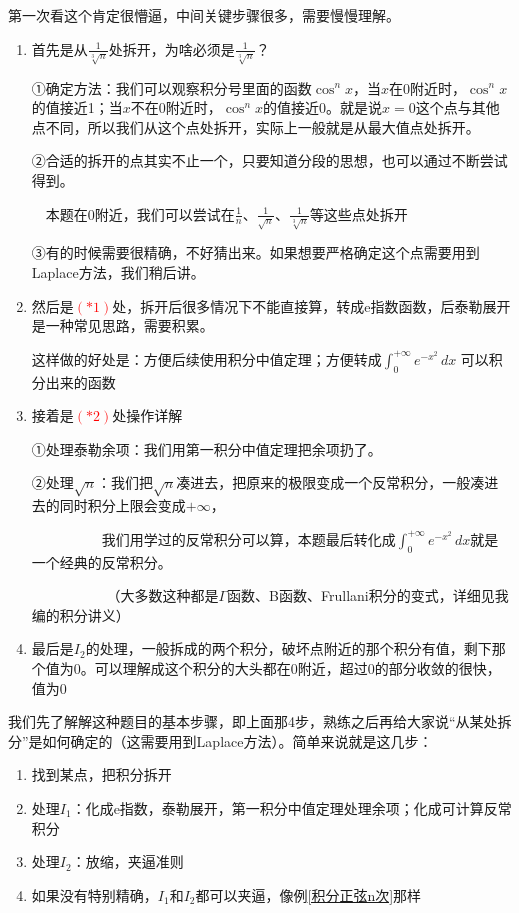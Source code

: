 \vspace{1mm}
\begin{remark}
第一次看这个肯定很懵逼，中间关键步骤很多，需要慢慢理解。
\begin{enumerate}
\item 首先是从$\frac{1}{\sqrt[3]{n}}$处拆开，为啥必须是$\frac{1}{\sqrt[3]{n}}$？

①确定方法：我们可以观察积分号里面的函数$\cos^n x$，当$x$在0附近时，$\cos^n x$的值接近1；当$x$不在0附近时，$\cos^n x$的值接近0。就是说$x=0$这个点与其他点不同，所以我们从这个点处拆开，实际上一般就是从最大值点处拆开。

②合适的拆开的点其实不止一个，只要知道分段的思想，也可以通过不断尝试得到。

$\quad$本题在0附近，我们可以尝试在$\frac{1}{n} $、$\frac{1}{\sqrt{n}} $、$\frac{1}{\sqrt[3]{n}} $等这些点处拆开

③有的时候需要很精确，不好猜出来。如果想要严格确定这个点需要用到Laplace方法，我们稍后讲。
\item 然后是\textcolor{red}{$(*1)$}处，拆开后很多情况下不能直接算，转成e指数函数，后泰勒展开是一种常见思路，需要积累。

这样做的好处是：方便后续使用积分中值定理；方便转成$\int_{0}^{+\infty}e^{-x^2}\,dx$
可以积分出来的函数 

\item 接着是\textcolor{red}{$(*2)$}处操作详解

①处理泰勒余项：我们用第一积分中值定理把余项扔了。

②处理$\sqrt{n}$：我们把$\sqrt{n}$凑进去，把原来的极限变成一个反常积分，一般凑进去的同时积分上限会变成$+\infty$，

$\quad \quad \quad\quad\quad$我们用学过的反常积分可以算，本题最后转化成$\int_{0}^{+\infty}e^{-x^2}\,dx$就是一个经典的反常积分。

$\quad \quad \quad\quad\quad$
（大多数这种都是$\Gamma$函数、B函数、Frullani积分的变式，详细见我编的积分讲义）
\item 最后是$I_2$的处理，一般拆成的两个积分，破坏点附近的那个积分有值，剩下那个值为0。可以理解成这个积分的大头都在0附近，超过0的部分收敛的很快，值为0
\end{enumerate}
\end{remark}

\vspace{3mm}
我们先了解解这种题目的基本步骤，即上面那4步，熟练之后再给大家说“从某处拆分”是如何确定的（这需要用到Laplace方法）。简单来说就是这几步：
\begin{enumerate}\label{steps}
\item 找到某点，把积分拆开
\item 处理$I_1$：化成e指数，泰勒展开，第一积分中值定理处理余项；化成可计算反常积分
\item 处理$I_2$：放缩，夹逼准则
\item 如果没有特别精确，$I_1$和$I_2$都可以夹逼，像例\ref{积分正弦n次}那样
\end{enumerate}

